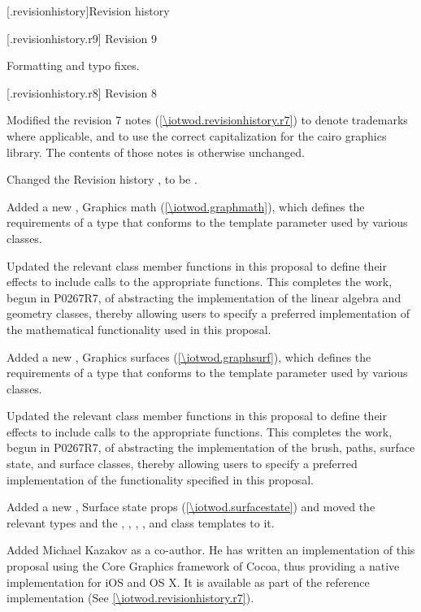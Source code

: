 \addtocounter{chapter}{-1} %
[\iotwod.revisionhistory]{Revision history}

 [\iotwod.revisionhistory.r9] {Revision 9}

\pnum
Formatting and typo fixes.

 [\iotwod.revisionhistory.r8] {Revision 8}

\pnum
Modified the revision 7 notes (\ref{\iotwod.revisionhistory.r7}) to denote trademarks where applicable, and to use the correct capitalization for the cairo graphics library. The contents of those notes is otherwise unchanged.

\pnum
Changed the Revision history \clause, to be .

\pnum
Added a new \clause, Graphics math (\ref{\iotwod.graphmath}), which defines the requirements of a type that conforms to the \graphicsmathtemplparam template parameter used by various classes.

\pnum
Updated the relevant class member functions in this proposal to define their effects to include calls to the appropriate \graphicsmathtemplparam functions. This completes the work, begun in P0267R7, of abstracting the implementation of the linear algebra and geometry classes, thereby allowing users to specify a preferred implementation of the mathematical functionality used in this proposal.

\pnum
Added a new \clause, Graphics surfaces (\ref{\iotwod.graphsurf}), which defines the requirements of a type that conforms to the \graphicssurfacestemplparam template parameter used by various classes.

\pnum
Updated the relevant class member functions in this proposal to define their effects to include calls to the appropriate \graphicssurfacestemplparam functions. This completes the work, begun in P0267R7, of abstracting the implementation of the brush, paths, surface state, and surface classes, thereby allowing users to specify a preferred implementation of the functionality specified in this proposal.

\pnum
Added a new \clause, Surface state props (\ref{\iotwod.surfacestate}) and moved the relevant  types and the , , , , and  class templates to it. 

\pnum
Added Michael Kazakov as a co-author. He has written an implementation of this proposal using the Core Graphics framework of Cocoa\textregistered{}, thus providing a native implementation for iOS\textregistered{} and OS X\textregistered{}. It is available as part of the reference implementation (See \ref{\iotwod.revisionhistory.r7}).

